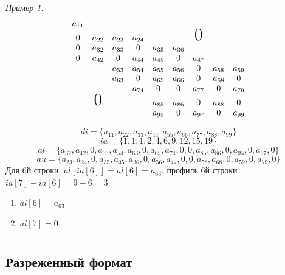 \documentclass[oneside]{book}
\theoremstyle{plain}
\theoremstyle{remark}
\newtheorem*{examp}{Пример}
\theoremstyle{definition}
\begin{document}
\begin{examp}
\-
\[ \begin{matrix}
a_{11} & & & & & & & & \\
0 & a_{22} & a_{23} & a_{24} & & &  \text{\huge0}& &  \\
0 & a_{32} & a_{33} & 0 & a_{35} & a_{36} & & &  \\
0 & a_{42} & 0 & a_{44} & a_{45} & 0 & a_{47} & &  \\
& & a_{53} & a_{54} & a_{55} & a_{56} & 0 & a_{58} & a_{59} \\
& & a_{63} & 0 & a_{65} & a_{66} & 0 & a_{68} & 0 \\
& & & a_{74} & 0 & 0 & a_{77} & 0 & a_{79} \\
& \text{\huge0}& &  & a_{85} & a_{86} & 0 & a_{88} & 0 \\
& & &  & a_{95} & 0 & a_{97} & 0 & a_{99}
\end{matrix} \]

\[ di = \{a_{11}, a_{22}, a_{33}, a_{44}, a_{55}, a_{66}, a_{77}, a_{88}, a_{99}\} \]
\[ ia = \{1, 1, 1, 2, 4, 6, 9, 12, 15, 19\} \]
\[ al = \{a_{32}, a_{42}, 0, a_{53}, a_{54}, a_{63}, 0, a_{65}, a_{74}, 0, 0, a_{85}, a_{86}, 0, a_{95}, 0, a_{97}, 0\} \]
\[ au = \{a_{23}, a_{24}, 0, a_{35}, a_{45}, a_{36}, 0, a_{56}, a_{47}, 0, 0, a_{58}, a_{68}, 0, a_{59}, 0, a_{79}, 0\} \]
Для 6й строки: \(al[ia[6]] = al[6] = a_{63}\), профиль 6й строки \(ia[7] - ia[6] = 9 - 6 = 3\)
\begin{enumerate}
\item \(al[6] = a_{63}\)
\item \(al[7] = 0\)
\end{enumerate}
\end{examp}
\chapter{}
\label{sec:orgca2764f}
\section{Разреженный формат}
\label{sec:orge8f2a51}
\end{document}
